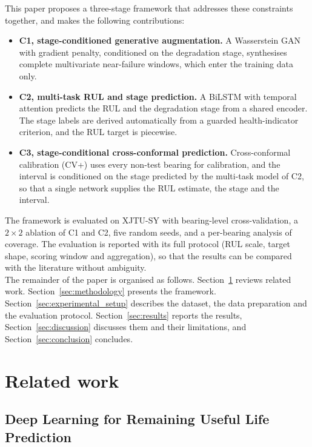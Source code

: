 \documentclass[review]{elsarticle}
\begin{document}
This paper proposes a three-stage framework that addresses these
constraints together, and makes the following contributions:
\begin{itemize}
  \item \textbf{C1, stage-conditioned generative augmentation.} A
  Wasserstein GAN with gradient penalty, conditioned on the degradation
  stage, synthesises complete multivariate near-failure windows, which
  enter the training data only.
  \item \textbf{C2, multi-task RUL and stage prediction.} A BiLSTM with
  temporal attention predicts the RUL and the degradation stage from a
  shared encoder. The stage labels are derived automatically from a
  guarded health-indicator criterion, and the RUL target is piecewise.
  \item \textbf{C3, stage-conditional cross-conformal prediction.}
  Cross-conformal calibration (CV+) uses every non-test bearing for
  calibration, and the interval is conditioned on the stage predicted
  by the multi-task model of C2, so that a single network supplies the
  RUL estimate, the stage and the interval.
\end{itemize}
The framework is evaluated on XJTU-SY with bearing-level
cross-validation, a $2 \times 2$ ablation of C1 and C2, five random
seeds, and a per-bearing analysis of coverage. The evaluation is
reported with its full protocol (RUL scale, target shape, scoring
window and aggregation), so that the results can be compared with the
literature without ambiguity.\\

The remainder of the paper is organised as follows.
Section~\ref{sec:related_work} reviews related work.
Section~\ref{sec:methodology} presents the framework.
Section~\ref{sec:experimental_setup} describes the dataset, the data
preparation and the evaluation protocol. Section~\ref{sec:results}
reports the results, Section~\ref{sec:discussion} discusses them and
their limitations, and Section~\ref{sec:conclusion} concludes.


\section{Related work}
\label{sec:related_work}

\subsection{Deep Learning for Remaining Useful Life Prediction}
\label{sec:dl_rul}
\end{document}

